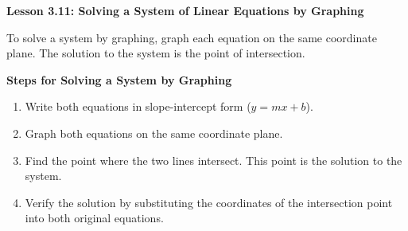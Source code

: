  \begin{center}
\textbf{Lesson 3.11: Solving a System of Linear Equations by Graphing}
\end{center}

\vspace*{1ex}

To solve a system by graphing, graph each equation on the same coordinate plane. The solution to the system is the point of intersection.

\noindent\textbf{Steps for Solving a System by Graphing}

\begin{enumerate}
    \item Write both equations in slope-intercept form ($y = mx + b$).
    \item Graph both equations on the same coordinate plane.
    \item Find the point where the two lines intersect. This point is the solution to the system.
    \item Verify the solution by substituting the coordinates of the intersection point into both original equations.
\end{enumerate}
